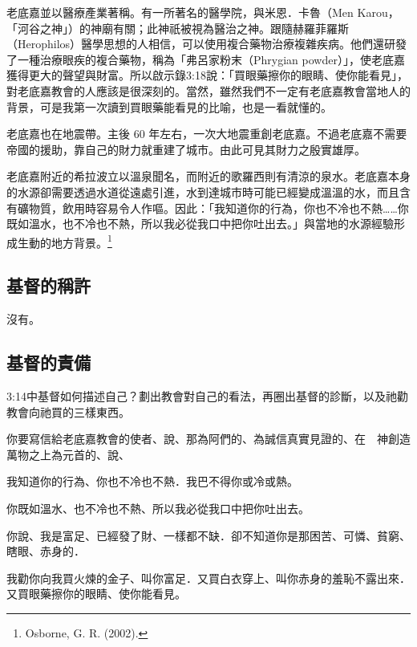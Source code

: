 老底嘉並以醫療產業著稱。有一所著名的醫學院，與米恩．卡魯（Men Karou，「河谷之神」）的神廟有關；此神祇被視為醫治之神。跟隨赫羅菲羅斯（Herophilos）醫學思想的人相信，可以使用複合藥物治療複雜疾病。他們還研發了一種治療眼疾的複合藥物，稱為「弗呂家粉末（Phrygian powder）」，使老底嘉獲得更大的聲望與財富。所以啟示錄3:18說：「買眼藥擦你的眼睛、使你能看見」，對老底嘉教會的人應該是很深刻的。當然，雖然我們不一定有老底嘉教會當地人的背景，可是我第一次讀到買眼藥能看見的比喻，也是一看就懂的。

老底嘉也在地震帶。主後 60 年左右，一次大地震重創老底嘉。不過老底嘉不需要帝國的援助，靠自己的財力就重建了城市。由此可見其財力之殷實雄厚。

老底嘉附近的希拉波立以溫泉聞名，而附近的歌羅西則有清涼的泉水。老底嘉本身的水源卻需要透過水道從遠處引進，水到達城市時可能已經變成溫溫的水，而且含有礦物質，飲用時容易令人作嘔。因此：「我知道你的行為，你也不冷也不熱……你既如溫水，也不冷也不熱，所以我必從我口中把你吐出去。」與當地的水源經驗形成生動的地方背景。\footnote{Osborne, G. R. (2002).}

\subsection{基督的稱許}

沒有。

\subsection{基督的責備}

\begin{ScriptureBox2}{3:14中基督如何描述自己？劃出教會對自己的看法，再圈出基督的診斷，以及祂勸教會向祂買的三樣東西。}

\item[3:14] 你要寫信給老底嘉教會的使者、說、那為阿們的、為誠信真實見證的、在　神創造萬物之上為元首的、說、

\item[3:15] 我知道你的行為、你也不冷也不熱．我巴不得你或冷或熱。

\item[3:16] 你既如溫水、也不冷也不熱、所以我必從我口中把你吐出去。

\item[3:17] 你說、我是富足、已經發了財、一樣都不缺．卻不知道你是那困苦、可憐、貧窮、瞎眼、赤身的．

\item[3:18] 我勸你向我買火煉的金子、叫你富足．又買白衣穿上、叫你赤身的羞恥不露出來．又買眼藥擦你的眼睛、使你能看見。

\end{ScriptureBox2}

